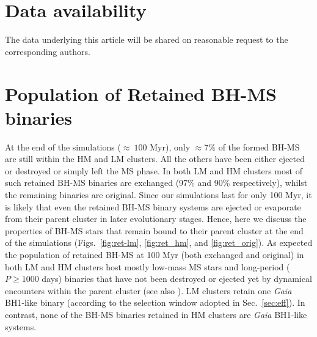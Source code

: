 \documentclass[fleqn,usenatbib]{mnras}
\newcommand{\bh}{\textit{Gaia} BH1}
\begin{document}
\section*{Data availability}
The data underlying this article will be shared on reasonable request to the corresponding authors.















\appendix 

\section{Population of Retained BH-MS binaries}\label{sec:app}

At the end of the simulations ($\approx \ 100 $ Myr), only $\approx 7 \%$ of the formed BH-MS are still within the HM and LM clusters. All the others have been either ejected or destroyed or simply left the MS phase.
 In both LM and HM clusters most of such retained BH-MS binaries are exchanged (97\% and 90\% respectively), whilst the remaining binaries are original. Since our simulations last for only 
100 Myr, it is likely that even the retained  BH-MS binary systems are ejected or evaporate from their parent cluster in  
later evolutionary stages. Hence, here we discuss the properties of BH-MS stars that remain bound to their parent cluster at the end of the simulations (Figs.~\ref{fig:ret-lm}, \ref{fig:ret_hm}, and \ref{fig:ret_orig}).
As expected the population of retained BH-MS at 100 Myr (both exchanged and original) in both LM and HM clusters host mostly 
low-mass MS stars and long-period ($P \geq 1000$ days) binaries that have not been destroyed or ejected yet by dynamical encounters within the parent cluster (see also \citealp{torniamenti2023}).
LM clusters retain one \bh{}-like binary (according to the selection window adopted in Sec.~\ref{sec:eff}). In contrast, none of the BH-MS binaries retained in HM clusters are \bh{}-like systems.
\end{document}
